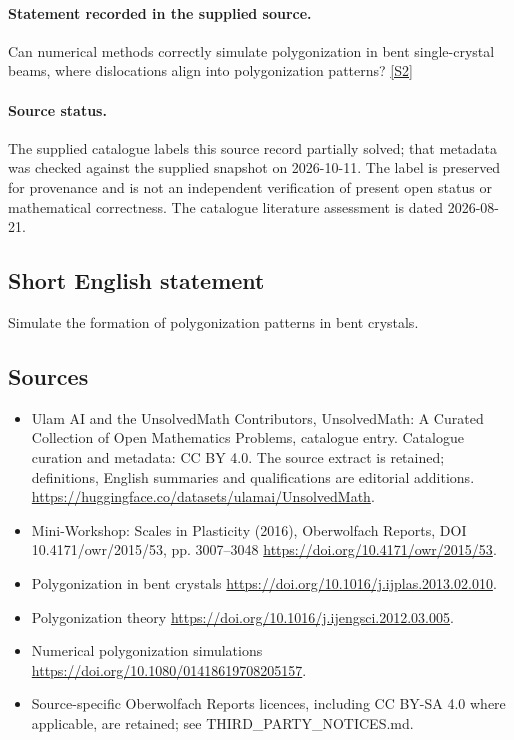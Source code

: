 \documentclass[11pt]{article}
\begin{document}
\paragraph{Statement recorded in the supplied source.}
Can numerical methods correctly simulate polygonization in bent single-crystal beams, where dislocations align into polygonization patterns? \href{https://doi.org/10.4171/owr/2015/53}{[S2]}
\paragraph{Source status.}
The supplied catalogue labels this source record partially solved; that metadata was checked against the supplied snapshot on 2026-10-11. The label is preserved for provenance and is not an independent verification of present open status or mathematical correctness. The catalogue literature assessment is dated 2026-08-21.
\subsection{Short English statement}
Simulate the formation of polygonization patterns in bent crystals.
\subsection{Sources}
\begin{itemize}
\item[S1] Ulam AI and the UnsolvedMath Contributors, UnsolvedMath: A Curated Collection of Open Mathematics Problems, catalogue entry. Catalogue curation and metadata: CC BY 4.0. The source extract is retained; definitions, English summaries and qualifications are editorial additions.
\url{https://huggingface.co/datasets/ulamai/UnsolvedMath}.
\item[S2] Mini-Workshop: Scales in Plasticity (2016), Oberwolfach Reports, DOI 10.4171/owr/2015/53, pp. 3007--3048
\url{https://doi.org/10.4171/owr/2015/53}.
\item[S3] Polygonization in bent crystals
\url{https://doi.org/10.1016/j.ijplas.2013.02.010}.
\item[S4] Polygonization theory
\url{https://doi.org/10.1016/j.ijengsci.2012.03.005}.
\item[S5] Numerical polygonization simulations
\url{https://doi.org/10.1080/01418619708205157}.
\item Source-specific Oberwolfach Reports licences, including CC BY-SA 4.0 where applicable, are retained; see THIRD\_PARTY\_NOTICES.md.
\end{itemize}
\end{document}
